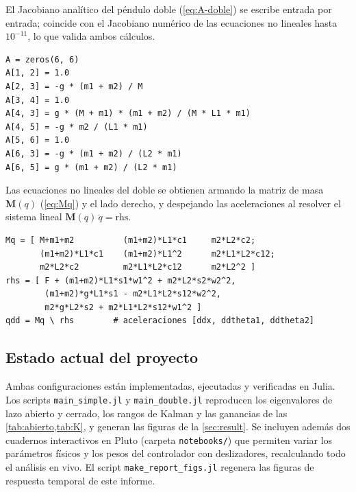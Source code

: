 \documentclass[11pt,letterpaper]{article}
\theoremstyle{definition}
\theoremstyle{plain}
\theoremstyle{remark}
\begin{document}
El Jacobiano analítico del péndulo doble (\cref{eq:A-doble}) se escribe entrada
por entrada; coincide con el Jacobiano numérico de las ecuaciones no lineales
hasta $10^{-11}$, lo que valida ambos cálculos.

\begin{lstlisting}
A = zeros(6, 6)
A[1, 2] = 1.0
A[2, 3] = -g * (m1 + m2) / M
A[3, 4] = 1.0
A[4, 3] = g * (M + m1) * (m1 + m2) / (M * L1 * m1)
A[4, 5] = -g * m2 / (L1 * m1)
A[5, 6] = 1.0
A[6, 3] = -g * (m1 + m2) / (L2 * m1)
A[6, 5] = g * (m1 + m2) / (L2 * m1)
\end{lstlisting}

Las ecuaciones no lineales del doble se obtienen armando la matriz de masa
$\mathbf{M}(q)$ (\cref{eq:Mq}) y el lado derecho, y despejando las aceleraciones
al resolver el sistema lineal $\mathbf{M}(q)\,\ddot q=\text{rhs}$.

\begin{lstlisting}
Mq = [ M+m1+m2          (m1+m2)*L1*c1     m2*L2*c2;
       (m1+m2)*L1*c1    (m1+m2)*L1^2      m2*L1*L2*c12;
       m2*L2*c2         m2*L1*L2*c12      m2*L2^2 ]
rhs = [ F + (m1+m2)*L1*s1*w1^2 + m2*L2*s2*w2^2,
        (m1+m2)*g*L1*s1 - m2*L1*L2*s12*w2^2,
        m2*g*L2*s2 + m2*L1*L2*s12*w1^2 ]
qdd = Mq \ rhs        # aceleraciones [ddx, ddtheta1, ddtheta2]
\end{lstlisting}

\subsection*{Estado actual del proyecto}

Ambas configuraciones están implementadas, ejecutadas y verificadas en Julia.
Los scripts \texttt{main\_simple.jl} y \texttt{main\_double.jl} reproducen los
eigenvalores de lazo abierto y cerrado, los rangos de Kalman y las ganancias de
las \cref{tab:abierto,tab:K}, y generan las figuras de la \cref{sec:result}. Se
incluyen además dos cuadernos interactivos en Pluto (carpeta
\texttt{notebooks/}) que permiten variar los parámetros físicos y los pesos del
controlador con deslizadores, recalculando todo el análisis en vivo. El script
\texttt{make\_report\_figs.jl} regenera las figuras de respuesta temporal de
este informe.
\end{document}
